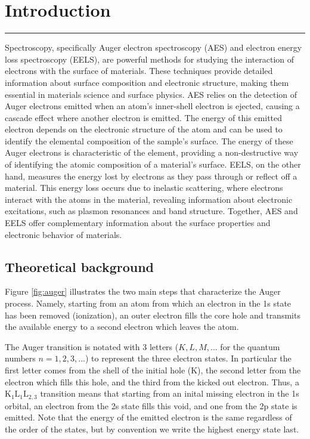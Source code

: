 \documentclass[12pt]{article}
\begin{document}
\section{Introduction}
\rule{\textwidth}{0.5pt}
\justifying
Spectroscopy, specifically Auger electron spectroscopy (AES) and electron energy loss spectroscopy (EELS), are powerful methods for studying the interaction of electrons with the surface of materials. These techniques provide detailed information about surface composition and electronic structure, making them essential in materials science and surface physics. AES relies on the detection of Auger electrons emitted when an atom’s inner-shell electron is ejected, causing a cascade effect where another electron is emitted. The energy of this emitted electron depends on the electronic structure of the atom and can be used to identify the elemental composition of the sample’s surface. The energy of these Auger electrons is characteristic of the element, providing a non-destructive way of identifying the atomic composition of a material’s surface. EELS, on the other hand, measures the energy lost by electrons as they pass through or reflect off a material. This energy loss occurs due to inelastic scattering, where electrons interact with the atoms in the material, revealing information about electronic excitations, such as plasmon resonances and band structure. Together, AES and EELS offer complementary information about the surface properties and electronic behavior of materials.

\subsection{Theoretical background}

Figure \ref{fig:auger} illustrates the two main steps that characterize the Auger process. Namely, starting from an atom from which an electron in the 1s state has been removed (ionization), an outer electron fills the core hole and transmits the available energy to a second electron which leaves the atom.

The Auger transition is notated with 3 letters ($K, L, M, ...$ for the quantum numbers $n=1, 2, 3, ...$) to represent the three electron states. In particular the first letter comes from the shell of the initial hole (K), the second letter from the electron which fills this hole, and the third from the kicked out electron. Thus, a $\text{K}_1\text{L}_1\text{L}_{2,3}$ transition means that starting from an inital missing electron in the 1s orbital, an electron from the 2s state fills this void, and one from the 2p state is emitted. Note that the energy of the emitted electron is the same regardless of the order of the states, but by convention we write the highest energy state last.
\end{document}
